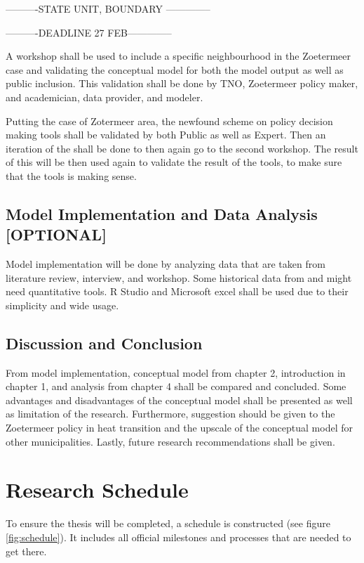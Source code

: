 ----------STATE UNIT, BOUNDARY --------------

----------DEADLINE 27 FEB--------------

A workshop shall be used to include a specific neighbourhood in the Zoetermeer case and validating the conceptual model for both the model output as well as public inclusion. This validation shall be done by TNO, Zoetermeer policy maker, and academician, data provider, and modeler.   

Putting the case of Zotermeer area, the newfound scheme on policy decision making tools shall be validated by both Public as well as Expert. Then an iteration of the shall be done to then again go to the second workshop. The result of this will be then used again to validate the result of the tools, to make sure that the tools is making sense. 

\subsection{Model Implementation and Data Analysis [OPTIONAL]}
Model implementation will be done by analyzing data that are taken from literature review, interview, and workshop. Some historical data from \citep{Eurostat2019EnergyOverview} and \citep{ZoetermeerMunicipality2019OpenZoetermeer} might need quantitative tools. R Studio and Microsoft excel shall be used due to their simplicity and wide usage. 

\subsection{Discussion and Conclusion}
From model implementation, conceptual model from chapter 2, introduction in chapter 1, and analysis from chapter 4 shall be compared and concluded. Some advantages and disadvantages of the conceptual model shall be presented as well as limitation of the research. Furthermore, suggestion should be given to the Zoetermeer policy in heat transition and the upscale of the conceptual model for other municipalities. Lastly, future research recommendations shall be given. 

\section{Research Schedule}
To ensure the thesis will be completed, a schedule is constructed (see figure \ref{fig:schedule}). It includes all official milestones and processes that are needed to get there. 

